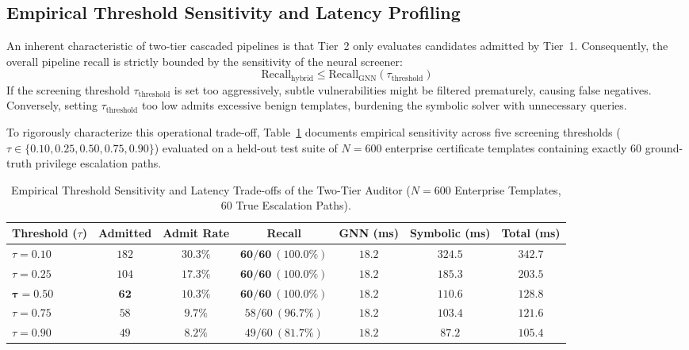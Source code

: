 \subsection{Empirical Threshold Sensitivity and Latency Profiling}
\label{subsec:threshold_sensitivity}
An inherent characteristic of two-tier cascaded pipelines is that Tier~2 only evaluates candidates admitted by Tier~1. Consequently, the overall pipeline recall is strictly bounded by the sensitivity of the neural screener:
\begin{equation}
\text{Recall}_{\text{hybrid}} \le \text{Recall}_{\text{GNN}}(\tau_{\text{threshold}})
\end{equation}
If the screening threshold $\tau_{\text{threshold}}$ is set too aggressively, subtle vulnerabilities might be filtered prematurely, causing false negatives. Conversely, setting $\tau_{\text{threshold}}$ too low admits excessive benign templates, burdening the symbolic solver with unnecessary queries.

To rigorously characterize this operational trade-off, Table~\ref{tab:threshold_sensitivity} documents empirical sensitivity across five screening thresholds ($\tau \in \{0.10, 0.25, 0.50, 0.75, 0.90\}$) evaluated on a held-out test suite of $N=600$ enterprise certificate templates containing exactly 60 ground-truth privilege escalation paths.

\begin{table}[ht]
\centering
\small
\setlength{\tabcolsep}{3.8pt}
\caption{Empirical Threshold Sensitivity and Latency Trade-offs of the Two-Tier Auditor ($N = 600$ Enterprise Templates, 60 True Escalation Paths).}
\label{tab:threshold_sensitivity}
\begin{tabular}{lcccccc}
\toprule
\textbf{Threshold ($\tau$)} & \textbf{Admitted} & \textbf{Admit Rate} & \textbf{Recall} & \textbf{GNN (ms)} & \textbf{Symbolic (ms)} & \textbf{Total (ms)} \\
\midrule
$\tau = 0.10$ & $182$ & $30.3\%$ & $\mathbf{60 / 60\ (100.0\%)}$ & $18.2$ & $324.5$ & $342.7$ \\
$\tau = 0.25$ & $104$ & $17.3\%$ & $\mathbf{60 / 60\ (100.0\%)}$ & $18.2$ & $185.3$ & $203.5$ \\
$\mathbf{\tau = 0.50}$ & $\mathbf{62}$ & $\mathbf{10.3\%}$ & $\mathbf{60 / 60\ (100.0\%)}$ & $\mathbf{18.2}$ & $\mathbf{110.6}$ & $\mathbf{128.8}$ \\
$\tau = 0.75$ & $58$ & $9.7\%$ & $58 / 60\ (96.7\%)$ & $18.2$ & $103.4$ & $121.6$ \\
$\tau = 0.90$ & $49$ & $8.2\%$ & $49 / 60\ (81.7\%)$ & $18.2$ & $87.2$ & $105.4$ \\
\bottomrule
\end{tabular}
\end{table}


